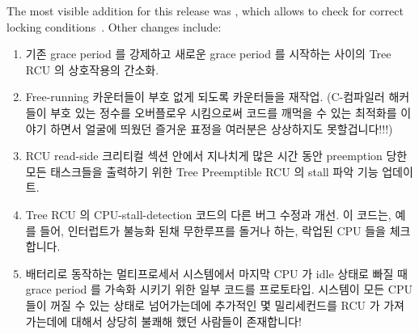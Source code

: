 The most visible addition for this release was ,
which allows  to check for correct locking
conditions~\cite{PaulEMcKenney2010LockdepRCU}.
Other changes include:
\fi

\begin{enumerate}
\item	기존 grace period 를 강제하고 새로운 grace period 를 시작하는 사이의
	Tree RCU 의 상호작용의 간소화.
\item	Free-running 카운터들이 부호 없게 되도록 카운터들을 재작업.
	(C-컴파일러 해커들이 부호 있는 정수를 오버플로우 시킴으로써 코드를
	깨먹을 수 있는 최적화를 이야기 하면서 얼굴에 띄웠던 즐거운 표정을
	여러분은 상상하지도 못할겁니다!!!)
\item	RCU read-side 크리티컬 섹션 안에서 지나치게 많은 시간 동안 preemption
	당한 모든 태스크들을 출력하기 위한 Tree Preemptible RCU 의 stall 파악
	기능 업데이트.
\item	Tree RCU 의 CPU-stall-detection 코드의 다른 버그 수정과 개선.
	이 코드는, 예를 들어, 인터럽트가 불능화 된채 무한루프를 돌거나 하는,
	락업된 CPU 들을 체크합니다.
\item	배터리로 동작하는 멀티프로세서 시스템에서 마지막 CPU 가 idle 상태로
	빠질 때 grace period 를 가속화 시키기 위한 일부 코드를 프로토타입.
	시스템이 모든 CPU 들이 꺼질 수 있는 상태로 넘어가는데에 추가적인 몇
	밀리세컨드를 RCU 가 가져가는데에 대해서 상당히 불쾌해 했던 사람들이
	존재합니다!

\end{enumerate}

